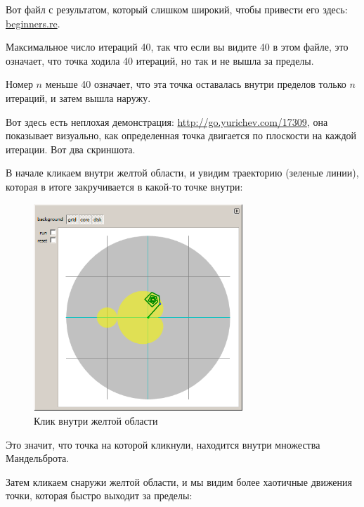 

Вот файл с результатом, который слишком широкий, чтобы привести его здесь: \\
\href{http://go.yurichev.com/17164}{beginners.re}.

Максимальное число итераций 40, так что если вы видите 40 в этом файле, это означает, что точка ходила
40 итераций, но так и не вышла за пределы.
 
Номер $n$ меньше 40 означает, что эта точка оставалась внутри пределов только $n$ итераций, и затем
вышла наружу.


\clearpage
Вот здесь есть неплохая демонстрация: 
\url{http://go.yurichev.com/17309}, она показывает визуально,
как определенная точка двигается по плоскости на каждой итерации. 
Вот два скриншота.

В начале кликаем внутри желтой области, и увидим траекторию (зеленые линии), которая в итоге
закручивается в какой-то точке внутри:%


\begin{figure}[H]
\centering
\includegraphics[width=0.7\textwidth]{examples/demos/mandelbrot/demo1.png}
\caption{Клик внутри желтой области}
\end{figure}

Это значит, что точка на которой кликнули, находится внутри множества Мандельброта.


\clearpage
Затем кликаем снаружи желтой области, и мы видим более хаотичные движения точки, которая быстро выходит
за пределы:


